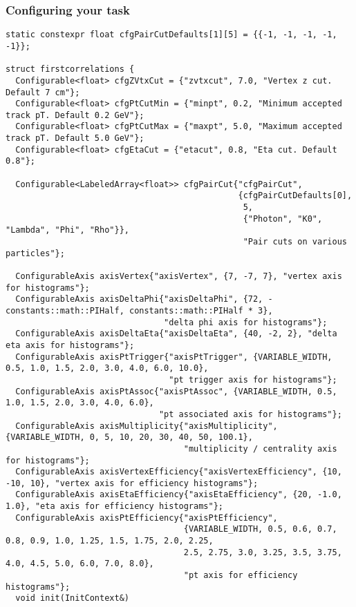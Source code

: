 \documentclass[14pt,aspectratio=169,t]{beamer}
\begin{document}
\begin{frame}[fragile]
  \frametitle{Configuring your task}
  \vspace{-0.15in}
  {\tiny\color{blue}
  \begin{verbatim}
static constexpr float cfgPairCutDefaults[1][5] = {{-1, -1, -1, -1, -1}};

struct firstcorrelations {
  Configurable<float> cfgZVtxCut = {"zvtxcut", 7.0, "Vertex z cut. Default 7 cm"};
  Configurable<float> cfgPtCutMin = {"minpt", 0.2, "Minimum accepted track pT. Default 0.2 GeV"};
  Configurable<float> cfgPtCutMax = {"maxpt", 5.0, "Maximum accepted track pT. Default 5.0 GeV"};
  Configurable<float> cfgEtaCut = {"etacut", 0.8, "Eta cut. Default 0.8"};

  Configurable<LabeledArray<float>> cfgPairCut{"cfgPairCut", 
                                               {cfgPairCutDefaults[0], 
                                                5, 
                                                {"Photon", "K0", "Lambda", "Phi", "Rho"}}, 
                                                "Pair cuts on various particles"};

  ConfigurableAxis axisVertex{"axisVertex", {7, -7, 7}, "vertex axis for histograms"};
  ConfigurableAxis axisDeltaPhi{"axisDeltaPhi", {72, -constants::math::PIHalf, constants::math::PIHalf * 3}, 
                                "delta phi axis for histograms"};
  ConfigurableAxis axisDeltaEta{"axisDeltaEta", {40, -2, 2}, "delta eta axis for histograms"};
  ConfigurableAxis axisPtTrigger{"axisPtTrigger", {VARIABLE_WIDTH, 0.5, 1.0, 1.5, 2.0, 3.0, 4.0, 6.0, 10.0}, 
                                 "pt trigger axis for histograms"};
  ConfigurableAxis axisPtAssoc{"axisPtAssoc", {VARIABLE_WIDTH, 0.5, 1.0, 1.5, 2.0, 3.0, 4.0, 6.0}, 
                               "pt associated axis for histograms"};
  ConfigurableAxis axisMultiplicity{"axisMultiplicity", {VARIABLE_WIDTH, 0, 5, 10, 20, 30, 40, 50, 100.1}, 
                                    "multiplicity / centrality axis for histograms"};
  ConfigurableAxis axisVertexEfficiency{"axisVertexEfficiency", {10, -10, 10}, "vertex axis for efficiency histograms"};
  ConfigurableAxis axisEtaEfficiency{"axisEtaEfficiency", {20, -1.0, 1.0}, "eta axis for efficiency histograms"};
  ConfigurableAxis axisPtEfficiency{"axisPtEfficiency", 
                                    {VARIABLE_WIDTH, 0.5, 0.6, 0.7, 0.8, 0.9, 1.0, 1.25, 1.5, 1.75, 2.0, 2.25, 
                                    2.5, 2.75, 3.0, 3.25, 3.5, 3.75, 4.0, 4.5, 5.0, 6.0, 7.0, 8.0}, 
                                    "pt axis for efficiency histograms"};
  void init(InitContext&)
  \end{verbatim}}
\end{frame}
\end{document}
